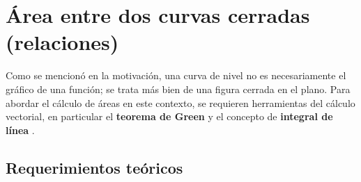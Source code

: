\documentclass[12pt]{article}
\begin{document}
\section*{Área entre dos curvas cerradas (relaciones)}

Como se mencionó en la motivación, una curva de nivel no es necesariamente el gráfico de una función; se trata más bien de una figura cerrada en el plano. Para abordar el cálculo de áreas en este contexto, se requieren herramientas del cálculo vectorial, en particular el \textbf{teorema de Green} y el concepto de \textbf{integral de línea} \cite{stewart12}.

\subsection*{Requerimientos teóricos}
\end{document}
